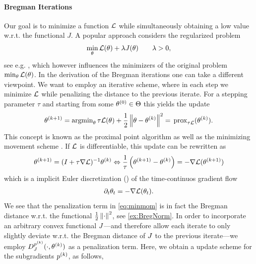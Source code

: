 \paragraph{Bregman Iterations} Our goal is to minimize a function $\mathcal{L}$ while simultaneously obtaining a low value w.r.t. the functional $J$. A popular approach considers the regularized problem
%
\begin{align*}
\min_\theta \mathcal{L}(\theta) + \lambda J(\theta)\qquad \lambda>0,
\end{align*}
%
see e.g. \cite{tikhonov1943stability, combettes2008proximal,daubechies2004iterative,fadili2006sparse,figueiredo2007gradient,chambolle2004algorithm,chambolle2011first}, which however influences the minimizers of the original problem $\min_\theta \mathcal{L}(\theta)$. In the derivation of the Bregman iterations one can take a different viewpoint. We want to employ an iterative scheme, where in each step we minimize $\mathcal{L}$ while penalizing the distance to the previous iterate. For a stepping parameter $\tau$ and starting from some $\theta^{(0)}\in\Theta$ this yields the update
%
\begin{align}\label{eq:minmom}
\theta^{(k+1)} = \operatorname{argmin}_\theta \tau\mathcal{L}(\theta) + \frac{1}{2}\left\|\theta -\theta^{(k)}\right\|^2 
= \,\mathrm{prox}_{\tau\mathcal{L}}(\theta^{(k)}).
\end{align}
%
This concept is known as the proximal point algorithm \cite{bregman1967relaxation} as well as the minimizing movement scheme \cite{de1993new}. If $\mathcal{L}$ is differentiable, this update can be rewritten as 
%
\begin{align*}
\param^\k{k+1} = (I+\tau\nabla\empLoss)^{-1}\param^\k{k}
%
\Leftrightarrow
%
\frac{1}{\tau}\left(\param^\k{k+1} - \param^\k{k}\right)
= -\nabla\empLoss(\param^\k{k+1})
\end{align*}
%
which is a implicit Euler discretization (\cite{euler1824institutionum}) of the time-continuos gradient flow
%
\begin{align*}
\partial_t \theta_t = -\nabla\mathcal{L}(\theta_t).
\end{align*}
%
%
We see that the penalization term in \cref{eq:minmom} is in fact the Bregman distance w.r.t. the functional $\frac{1}{2}\left\|\cdot\right\|^2$, see \cref{ex:BregNorm}. In order to incorporate an arbitrary convex functional $J$---and therefore allow each iterate to only slightly deviate w.r.t. the Bregman distance of $J$ to the previous iterate---we employ $D_J^{p^{(k)}}(\cdot, \theta^{(k)})$ as a penalization term. Here, we obtain a update scheme for the subgradients $p^{(k)}$, as follows,

